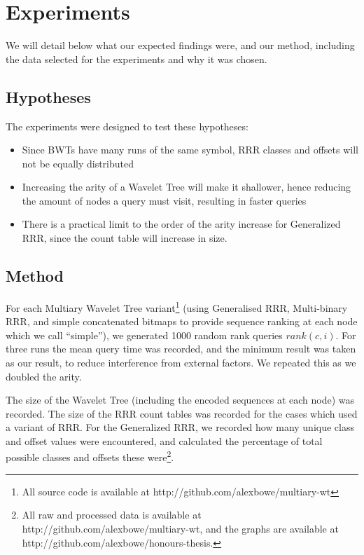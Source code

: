 \section{Experiments}
\label{sec:experiments}

We will detail below what our expected findings were, and our method, including 
the data selected for the experiments and why it was chosen.

\subsection{Hypotheses}
The experiments were designed to test these hypotheses:

\begin{itemize}
    \item 	
			Since BWTs have many runs of the same symbol, RRR classes and 
			offsets will not be equally distributed

    \item 	
			Increasing the arity of a Wavelet Tree will make it shallower,
		   	hence reducing the amount of nodes a query must visit, resulting
		   	in faster queries
			
    \item  
			There is a practical limit to the order of the arity increase for 
		   	Generalized RRR, since the count table will increase in size.
\end{itemize}

\subsection{Method}
For each Multiary Wavelet Tree variant\footnote{All source code is available at http://github.com/alexbowe/multiary-wt} (using Generalised RRR, Multi-binary
RRR, and simple concatenated bitmaps to provide
sequence ranking at each node which we call ``simple''), we generated 1000 
random rank queries $rank(c, i)$. For three runs the mean query time was 
recorded, and the minimum result was taken as our result, to reduce interference 
from external factors. We repeated this as we doubled the arity.

The size of  the Wavelet Tree (including the encoded sequences at each node) was 
recorded. The size of the RRR count tables was recorded for the cases which used 
a variant of RRR. For the Generalized RRR, we recorded how many unique class and 
offset values were encountered, and calculated the percentage of total possible 
classes and offsets these were\footnote{All raw and processed data is 
available at http://github.com/alexbowe/multiary-wt, and the graphs are 
available at http://github.com/alexbowe/honours-thesis.}.

